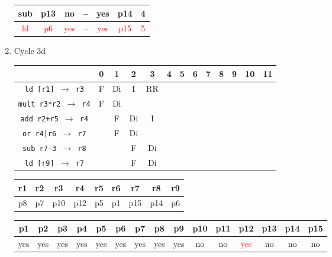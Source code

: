 \documentclass[12pt]{article}
\begin{document}
\begin{enumerate}
\begin{table}[H]
\begin{tabular}{|c|c|c|c|c|c|c|}
					\hline
					sub & p13 & no & -- & yes & p14 & 4\\
					\hline
					\textcolor{red}{ld} & \textcolor{red}{p6} & \textcolor{red}{yes} & \textcolor{red}{--} & \textcolor{red}{yes} & \textcolor{red}{p15} & \textcolor{red}{5}\\
					\hline
				\end{tabular}
			\end{table}
		\item
			Cycle 3d
			\begin{table}[H]
				\begin{tabular}{|c|c|c|c|c|c|c|c|c|c|c|c|c|}
					\hline
					 & 0 & 1 & 2 & 3 & 4 & 5 & 6 & 7 & 8 & 9 & 10 & 11\\
					\hline
					\texttt{ld [r1] $\rightarrow$ r3} & F & Di & I & RR &  &  &  &  &  &  &  &\\
					\hline
					\texttt{mult r3*r2 $\rightarrow$ r4} & F & Di &  &  &  &  &  &  &  &  &  &\\
					\hline
					\texttt{add r2+r5 $\rightarrow$ r4} &  & F & Di & I &  &  &  &  &  &  &  &\\
					\hline
					\texttt{or r4|r6 $\rightarrow$ r7} &  & F & Di &  &  &  &  &  &  &  &  &\\
					\hline
					\texttt{sub r7-3 $\rightarrow$ r8} &  &  & F & Di &  &  &  &  &  &  &  &\\
					\hline
					\texttt{ld [r9] $\rightarrow$ r7} &  &  & F & Di &  &  &  &  &  &  &  &\\
					\hline 
				\end{tabular}
			\end{table}
			\begin{table}[H]
				\begin{tabular}{|c|c|c|c|c|c|c|c|c|}
					\hline
					r1 & r2 & r3 & r4 & r5 & r6 & r7 & r8 & r9\\
					\hline
					p8 & p7 & p10 & p12 & p5 & p1 & p15 & p14 & p6\\
					\hline
				\end{tabular}
			\end{table}
			\begin{table}[H]
				\begin{tabular}{|c|c|c|c|c|c|c|c|c|c|c|c|c|c|c|}
					\hline
					p1 & p2 & p3 & p4 & p5 & p6 & p7 & p8 & p9 & p10 & p11 & p12 & p13 & p14 & p15\\
					\hline
					yes & yes & yes & yes & yes & yes & yes & yes & yes & no & no & \textcolor{red}{yes} & no & no & no\\
					\hline

\end{tabular}
\end{table}
\end{enumerate}
\end{document}

